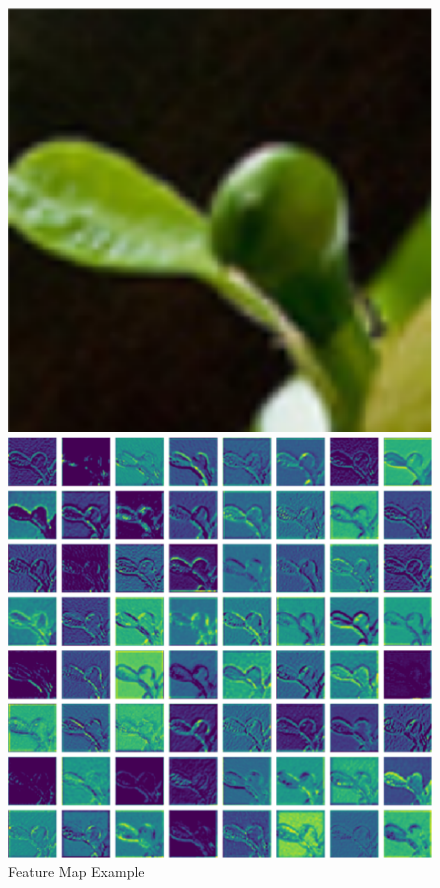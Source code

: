 \documentclass{article}
\begin{document}
\begin{figure}
    \centering
    \begin{minipage}{.30\textwidth}
        \includegraphics[width=\textwidth]{fmp_origin}
    \end{minipage}
    \hfill
    \begin{minipage}{.65\textwidth}
        \includegraphics[width=\textwidth]{fmp}
    \end{minipage}
    \caption{Feature Map Example}
    \label{fig:featuremapexample}
\end{figure}
\end{document}
